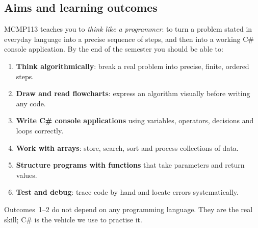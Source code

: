\documentclass[11pt,a4paper]{article}
\newcommand{\term}[1]{\textbf{\color{ink}#1}}
\begin{document}
\subsection{Aims and learning outcomes}
MCMP113 teaches you to \emph{think like a programmer}: to turn a problem stated in everyday language into a precise sequence of steps, and then into a working C\# console application. By the end of the semester you should be able to:
\begin{enumerate}[leftmargin=*,itemsep=1pt]
  \item \term{Think algorithmically}: break a real problem into precise, finite, ordered steps.
  \item \term{Draw and read flowcharts}: express an algorithm visually before writing any code.
  \item \term{Write C\# console applications} using variables, operators, decisions and loops correctly.
  \item \term{Work with arrays}: store, search, sort and process collections of data.
  \item \term{Structure programs with functions} that take parameters and return values.
  \item \term{Test and debug}: trace code by hand and locate errors systematically.
\end{enumerate}
Outcomes~1--2 do not depend on any programming language. They are the real skill; C\# is the vehicle we use to practise it.
\end{document}
